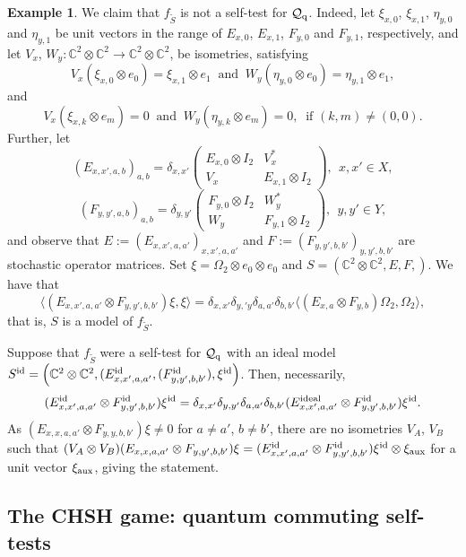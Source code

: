 \documentclass[11pt]{amsart}
\theoremstyle{definition}
\newtheorem{example}[theorem]{Example}
\newcommand{\cl}[1]{\mathcal{#1}}
\newcommand{\bb}[1]{\mathbb{#1}}
\providecommand{\wt}[1]{\widetilde{#1}}
\begin{document}
\begin{example}
We claim that $f_{\wt{S}}$ is not a self-test for $\cl Q_{\rm q}$. 
Indeed, let 
$\xi_{x,0}$, $\xi_{x,1}$,  $\eta_{y,0}$ and $\eta_{y,1}$ be unit vectors in the range of $E_{x,0}$, $E_{x,1}$, $F_{y,0}$ and $F_{y,1}$, respectively, 
and let
$V_x$, $W_y:\mathbb C^2\otimes\mathbb C^2\to\mathbb C^2\otimes\mathbb C^2$, 
be isometries, satisfying
$$V_x(\xi_{x,0}\otimes e_{0}) = \xi_{x,1}\otimes e_{1} \ \mbox{ and } \ 
W_y(\eta_{y,0}\otimes e_0) = \eta_{y,1}\otimes e_1,$$ 
and
$$V_x(\xi_{x,k}\otimes e_m) = 0  \ \mbox{ and } \   W_y(\eta_{y,k}\otimes e_m) = 0,
\ \mbox{ if } (k,m)\ne (0,0).$$
Further, let 
$$(E_{x,x',a,b})_{a,b}=\delta_{x,x'}\left(\begin{array}{cc}E_{x,0}\otimes I_2&V_x^*\\V_x&E_{x,1}\otimes I_2\end{array}\right), \ \ x,x'\in X,$$
$$(F_{y,y',a,b})_{a,b}=\delta_{y,y'}\left(\begin{array}{cc}F_{y,0}\otimes I_2&W_y^*\\W_y&F_{y,1}\otimes I_2\end{array}\right), \ \ y,y'\in Y,$$
 and observe that 
 $E := (E_{x,x',a,a'})_{x,x',a,a'}$ and $F := (F_{y,y',b,b'})_{y,y',b,b'}$ are stochastic operator matrices.
Set $\xi = \Omega_2\otimes e_0\otimes e_0$ and
$S = \left(\bb{C}^2\otimes \bb{C}^2, E,F, \right)$.
We have that 
 $$\langle (E_{x,x',a,a'}\otimes F_{y,y',b,b'})\xi,\xi\rangle=\delta_{x,x'}\delta_{y,'y}\delta_{a,a'}\delta_{b,b'}\langle (E_{x,a}\otimes F_{y,b})\Omega_2,\Omega_2\rangle,$$
that is, $S$ is a model of $f_{\wt{S}}$.

Suppose that $f_{\wt{S}}$ were a self-test for $\cl Q_{\rm q}$ 
with an ideal model 
$S^{\rm id} = \left(\bb{C}^2\otimes \bb{C}^2, (E_{x,x',a,a'}^{\rm id}, (F_{y,y',b,b'}^{\rm id}),\xi^{\rm id}\right)$.
Then, necessarily,
$$ (E_{x,x',a,a'}^{\rm id}\otimes F_{y,y',b,b'}^{\rm id})\xi^{\rm id} = \delta_{x,x'}\delta_{y,y'}\delta_{a,a'}\delta_{b,b'}(E_{x,x',a,a'}^{\rm ideal}\otimes F_{y,y',b,b'}^{\rm id})\xi^{\rm id}.$$
 As $(E_{x,x,a,a'}\otimes F_{y,y,b,b'})\xi\ne 0$ for $a\ne a'$, $b\ne b'$,  there are no isometries $V_A$, $V_B$ such that $(V_A\otimes V_B)(E_{x,x,a,a'}\otimes F_{y,y',b,b'})\xi=(E_{x,x',a,a'}^{\rm id}\otimes F_{y,y',b,b'}^{\rm id})\xi^{\rm id}\otimes\xi_{\rm aux}$ for a unit vector $\xi_{\rm aux}$, giving the statement.
\end{example}

\subsection{The CHSH game: quantum commuting self-tests}
\label{ss_CSHS-qcst}
\end{document}

